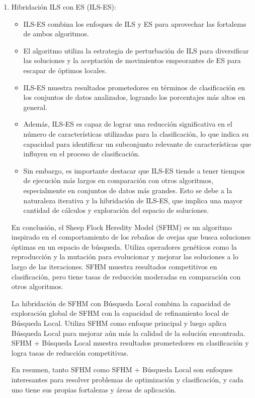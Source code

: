 \begin{enumerate}
\begin{itemize}
	\end{itemize}
	
	\item Hibridación ILS con ES (ILS-ES):
	\begin{itemize}
		\item ILS-ES combina los enfoques de ILS y ES para aprovechar las fortalezas de ambos algoritmos.
		\item El algoritmo utiliza la estrategia de perturbación de ILS para diversificar las soluciones y la aceptación de movimientos empeorantes de ES para escapar de óptimos locales.
		\item ILS-ES muestra resultados prometedores en términos de clasificación en los conjuntos de datos analizados, logrando los porcentajes más altos en general.
		\item Además, ILS-ES es capaz de lograr una reducción significativa en el número de características utilizadas para la clasificación, lo que indica su capacidad para identificar un subconjunto relevante de características que influyen en el proceso de clasificación.
		
		\item Sin embargo, es importante destacar que ILS-ES tiende a tener tiempos de ejecución más largos en comparación con otros algoritmos, especialmente en conjuntos de datos más grandes. Esto se debe a la naturaleza iterativa y la hibridación de ILS-ES, que implica una mayor cantidad de cálculos y exploración del espacio de soluciones.
	\end{itemize}
	
	En conclusión, el Sheep Flock Heredity Model (SFHM) es un algoritmo inspirado en el comportamiento de los rebaños de ovejas que busca soluciones óptimas en un espacio de búsqueda. Utiliza operadores genéticos como la reproducción y la mutación para evolucionar y mejorar las soluciones a lo largo de las iteraciones. SFHM muestra resultados competitivos en clasificación, pero tiene tasas de reducción moderadas en comparación con otros algoritmos.
	
	La hibridación de SFHM con Búsqueda Local combina la capacidad de exploración global de SFHM con la capacidad de refinamiento local de Búsqueda Local. Utiliza SFHM como enfoque principal y luego aplica Búsqueda Local para mejorar aún más la calidad de la solución encontrada. SFHM + Búsqueda Local muestra resultados prometedores en clasificación y logra tasas de reducción competitivas.
	
	En resumen, tanto SFHM como SFHM + Búsqueda Local son enfoques interesantes para resolver problemas de optimización y clasificación, y cada uno tiene sus propias fortalezas y áreas de aplicación.
\end{enumerate}


